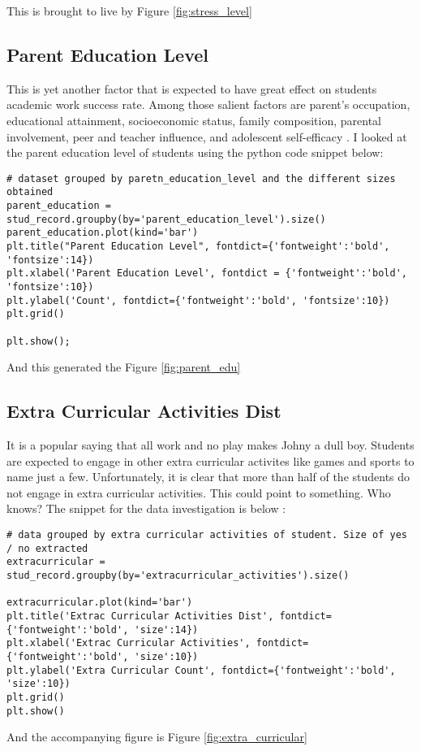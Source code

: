 This is brought to live by Figure \ref{fig:stress_level}

\subsection{Parent Education Level}
This is yet another factor that is expected to have great effect on students academic work success rate. 
Among those salient factors are parent’s occupation, educational
attainment, socioeconomic status, family composition, parental involvement, peer and teacher influence, and adolescent self-efficacy \cite{nelson_impact_nodate}. 
I looked at the parent education level of students using the python code snippet below:
\begin{verbatim}
# dataset grouped by paretn_education_level and the different sizes obtained
parent_education = stud_record.groupby(by='parent_education_level').size()
parent_education.plot(kind='bar')
plt.title("Parent Education Level", fontdict={'fontweight':'bold', 'fontsize':14})
plt.xlabel('Parent Education Level', fontdict = {'fontweight':'bold', 'fontsize':10})
plt.ylabel('Count', fontdict={'fontweight':'bold', 'fontsize':10})
plt.grid()

plt.show();
\end{verbatim}

And this generated the Figure \ref{fig:parent_edu}

\subsection{Extra Curricular Activities Dist}
It is a popular saying that all work and no play makes Johny a dull boy. Students are expected to engage in other extra curricular activites like games and sports to name just a few.
Unfortunately, it is clear that more than half of the students do not engage in extra curricular activities. This could point to something. Who knows? The snippet for the data investigation is below : 
\begin{verbatim}
# data grouped by extra curricular activities of student. Size of yes / no extracted
extracurricular = stud_record.groupby(by='extracurricular_activities').size()

extracurricular.plot(kind='bar')
plt.title('Extrac Curricular Activities Dist', fontdict={'fontweight':'bold', 'size':14})
plt.xlabel('Extrac Curricular Activities', fontdict={'fontweight':'bold', 'size':10})
plt.ylabel('Extra Curricular Count', fontdict={'fontweight':'bold', 'size':10})
plt.grid()
plt.show()
\end{verbatim}
And the accompanying figure is Figure \ref{fig:extra_curricular}

